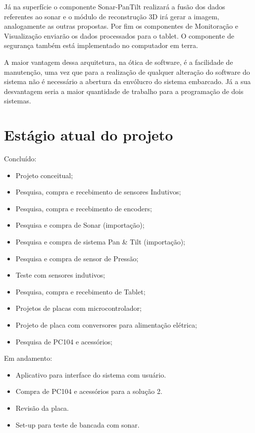 Já na superfície o componente Sonar-PanTilt realizará a fusão dos dados
referentes ao sonar e o módulo de reconstrução 3D irá gerar a imagem,
analogamente as outras propostas. Por fim os componentes de Monitoração e
Visualização enviarão os dados processados para o tablet. O componente de
segurança também está implementado no computador em terra.

A maior vantagem dessa arquitetura, na ótica de software, é a facilidade de
manutenção, uma vez que para a realização de qualquer alteração do software do
sistema não é necessário a abertura da envólucro do sistema embarcado. Já a sua
desvantagem seria a maior quantidade de trabalho para a programação de dois
sistemas.

\section{Estágio atual do projeto}

Concluído:
\begin{itemize}
  \item Projeto conceitual;
  \item Pesquisa, compra e recebimento de sensores Indutivos;
  \item Pesquisa, compra e recebimento de encoders;
  \item Pesquisa e compra de Sonar (importação);
  \item Pesquisa e compra de sistema Pan & Tilt (importação);
  \item Pesquisa e compra de sensor de Pressão;
  \item Teste com sensores indutivos;
  \item Pesquisa, compra e recebimento de Tablet;
  \item Projetos de placas com microcontrolador;
  \item Projeto de placa com conversores para alimentação elétrica;
  \item Pesquisa de PC104 e acessórios;   
\end{itemize}
Em andamento:
\begin{itemize}
  \item Aplicativo para interface do sistema com usuário.
  \item Compra de PC104 e acessórios para a solução 2.
  \item Revisão da placa.
  \item Set-up para teste de bancada com sonar.
\end{itemize}